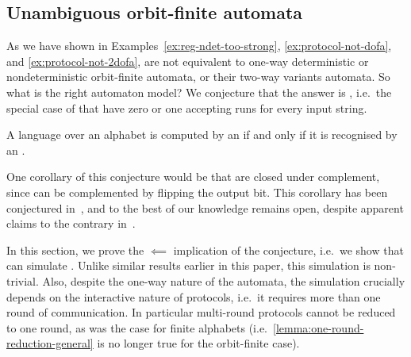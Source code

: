 \subsection{Unambiguous orbit-finite automata}
\label{sec:unambiguous-orbit-finite-automata}
\AP
As we have shown in Examples~\ref{ex:reg-ndet-too-strong}, \ref{ex:protocol-not-dofa},
and \ref{ex:protocol-not-2dofa},
 are not equivalent to one-way deterministic or
nondeterministic orbit-finite automata, or their two-way variants automata. So
what is the right automaton model?  We conjecture that the answer is
, i.e.~the special case of
 that have zero or one accepting runs for
every input string.

\begin{conjecture}
    \label{conj:protocols-unambiguous}
    A language over an  alphabet is computed by 
    an  if and only if it is recognised by an .
\end{conjecture}

One corollary of this conjecture would be that  are closed under complement, since  can
be complemented by flipping the output bit. This corollary has been conjectured
in~\cite[p.9]{colcombet2012forms}, and to the best of our knowledge remains
open, despite apparent claims to the contrary in~\cite[Footnote
5]{colcombet2015unambiguity}.

In this section, we prove the $\impliedby$ implication of the conjecture, i.e.~we
show that  can simulate . Unlike similar results earlier in this paper, this simulation is
non-trivial. Also, despite the one-way nature of the automata, the simulation
crucially depends on the interactive nature of protocols, i.e.~it requires more
than one round of communication. In particular multi-round protocols cannot be
reduced to one round, as was the case for finite alphabets
(i.e.~\cref{lemma:one-round-reduction-general} is no longer true for the
orbit-finite case).

